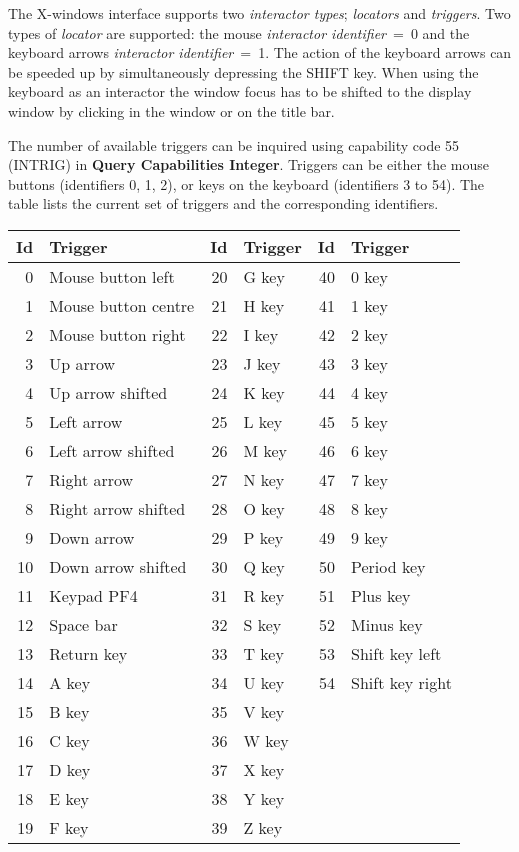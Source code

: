 The X-windows interface supports two {\it interactor types}; {\it locators}
and {\it triggers}. Two types of {\it locator} are supported: the mouse
{\it interactor identifier}~=~0 and the keyboard arrows
{\it interactor identifier}~=~1. The action of the keyboard arrows can be
speeded up by simultaneously depressing the SHIFT key. When using the keyboard
as an interactor the window focus has to be shifted to the display window
by clicking in the window or on the title bar.

The number of available triggers can be inquired using capability code
55 (INTRIG) in {\bf Query Capabilities Integer}.
Triggers can be either the mouse buttons (identifiers 0, 1, 2), or keys on
the keyboard (identifiers 3 to 54). The table lists the current set
of triggers and the corresponding identifiers.

\begin{small}
\begin{center}
\begin{tabular}{|r|p{9em}||r|p{9em}||r|p{9em}|}
\hline
Id & Trigger & Id & Trigger & Id & Trigger \\
\hline
0 & Mouse button left   & 20 &  G key & 40 & 0 key \\
1 & Mouse button centre & 21 &  H key & 41 & 1 key \\
2 & Mouse button right  & 22 &  I key & 42 & 2 key \\
3 & Up arrow            & 23 &  J key & 43 & 3 key \\
4 & Up arrow shifted    & 24 &  K key & 44 & 4 key \\
5 & Left arrow          & 25 &  L key & 45 & 5 key \\
6 & Left arrow shifted  & 26 &  M key & 46 & 6 key \\
7 & Right arrow         & 27 &  N key & 47 & 7 key \\
8 & Right arrow shifted & 28 &  O key & 48 & 8 key \\
9 & Down arrow          & 29 &  P key & 49 & 9 key \\
10 & Down arrow shifted  & 30 & Q key & 50 & Period key \\
11 & Keypad PF4          & 31 & R key & 51 & Plus key \\
12 & Space bar           & 32 & S key & 52 & Minus key \\
13 & Return key          & 33 & T key & 53 & Shift key left \\
14 & A key               & 34 & U key & 54 & Shift key right \\
15 & B key               & 35 & V key & & \\
16 & C key               & 36 & W key & & \\
17 & D key               & 37 & X key & & \\
18 & E key               & 38 & Y key & & \\
19 & F key               & 39 & Z key & & \\
\hline
\end{tabular}
\end{center}
\end{small}

